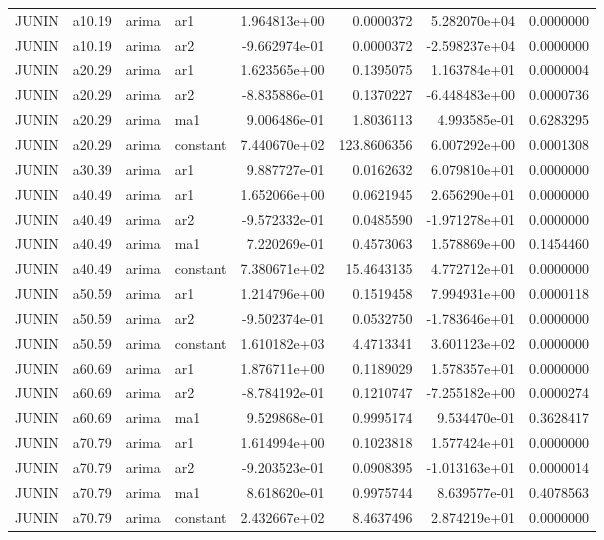 \documentclass[
]{article}
\begin{document}
\begin{table}[!h]
\begin{tabular}[t]{llllrrrr}
JUNIN & a10.19 & arima & ar1 & 1.964813e+00 & 0.0000372 & 5.282070e+04 & 0.0000000\\
\addlinespace
JUNIN & a10.19 & arima & ar2 & -9.662974e-01 & 0.0000372 & -2.598237e+04 & 0.0000000\\
JUNIN & a20.29 & arima & ar1 & 1.623565e+00 & 0.1395075 & 1.163784e+01 & 0.0000004\\
JUNIN & a20.29 & arima & ar2 & -8.835886e-01 & 0.1370227 & -6.448483e+00 & 0.0000736\\
JUNIN & a20.29 & arima & ma1 & 9.006486e-01 & 1.8036113 & 4.993585e-01 & 0.6283295\\
JUNIN & a20.29 & arima & constant & 7.440670e+02 & 123.8606356 & 6.007292e+00 & 0.0001308\\
\addlinespace
JUNIN & a30.39 & arima & ar1 & 9.887727e-01 & 0.0162632 & 6.079810e+01 & 0.0000000\\
JUNIN & a40.49 & arima & ar1 & 1.652066e+00 & 0.0621945 & 2.656290e+01 & 0.0000000\\
JUNIN & a40.49 & arima & ar2 & -9.572332e-01 & 0.0485590 & -1.971278e+01 & 0.0000000\\
JUNIN & a40.49 & arima & ma1 & 7.220269e-01 & 0.4573063 & 1.578869e+00 & 0.1454460\\
JUNIN & a40.49 & arima & constant & 7.380671e+02 & 15.4643135 & 4.772712e+01 & 0.0000000\\
\addlinespace
JUNIN & a50.59 & arima & ar1 & 1.214796e+00 & 0.1519458 & 7.994931e+00 & 0.0000118\\
JUNIN & a50.59 & arima & ar2 & -9.502374e-01 & 0.0532750 & -1.783646e+01 & 0.0000000\\
JUNIN & a50.59 & arima & constant & 1.610182e+03 & 4.4713341 & 3.601123e+02 & 0.0000000\\
JUNIN & a60.69 & arima & ar1 & 1.876711e+00 & 0.1189029 & 1.578357e+01 & 0.0000000\\
JUNIN & a60.69 & arima & ar2 & -8.784192e-01 & 0.1210747 & -7.255182e+00 & 0.0000274\\
\addlinespace
JUNIN & a60.69 & arima & ma1 & 9.529868e-01 & 0.9995174 & 9.534470e-01 & 0.3628417\\
JUNIN & a70.79 & arima & ar1 & 1.614994e+00 & 0.1023818 & 1.577424e+01 & 0.0000000\\
JUNIN & a70.79 & arima & ar2 & -9.203523e-01 & 0.0908395 & -1.013163e+01 & 0.0000014\\
JUNIN & a70.79 & arima & ma1 & 8.618620e-01 & 0.9975744 & 8.639577e-01 & 0.4078563\\
JUNIN & a70.79 & arima & constant & 2.432667e+02 & 8.4637496 & 2.874219e+01 & 0.0000000\\

\end{tabular}
\end{table}
\end{document}
